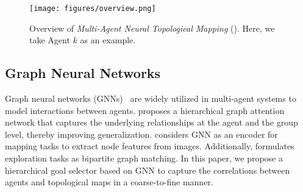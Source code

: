 
\begin{figure*}[t!]
	\centering
 \vspace{2mm}
    \texttt{[image: figures/overview.png]}
	\centering \caption{Overview of \emph{Multi-Agent Neural Topological Mapping} ({\name}). Here, we take Agent $k$ as an example.}
\label{fig:Overview}
\vspace{-5mm}
\end{figure*}
\subsection{Graph Neural Networks}
Graph neural networks (GNNs)~\cite{gnn} are widely utilized in multi-agent systems to model interactions between agents. 
\cite{gnn_hierarchical} proposes a hierarchical graph attention network that captures the underlying relationships at the agent and the group level, thereby improving generalization. \cite{vgm} considers GNN as an encoder for mapping tasks to extract node features from images. Additionally, \cite{cvpr22} formulates exploration tasks as bipartite graph matching. In this paper, we propose a hierarchical goal selector based on GNN to capture the correlations between agents and topological maps in a coarse-to-fine manner.



